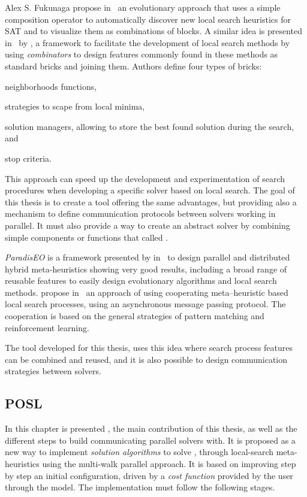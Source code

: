 Alex S. Fukunaga propose in~\cite{Fukunaga2008} an evolutionary approach that uses a simple composition operator to automatically discover new local search heuristics for SAT and to visualize them as combinations of blocks. A similar idea is presented in~\cite{Landtsheer2015} by , a framework to facilitate the development of local search methods by using \textit{combinators} to design features commonly found in these methods as standard bricks and joining them. Authors define four types of bricks: \begin{inparaenum}[1-] \item neighborhoods functions, \item strategies to scape from local minima, \item solution managers, allowing to store the best found solution during the search, and \item stop criteria.
\end{inparaenum} This approach can speed up the development and experimentation of search procedures when developing a specific solver based on local search. The goal of this thesis is to create a tool offering the same advantages, but providing also a mechanism to define communication protocols between solvers working in parallel. It must also provide a way to create an abstract solver by combining simple components or functions that called \ms.

{\it ParadisEO} is a framework presented by  in~\cite{Cahon2004} to design parallel and distributed hybrid meta-heuristics showing very good results, including a broad range of reusable features to easily design evolutionary algorithms and local search methods.  propose in~\cite{Martin2016} an approach of using cooperating meta--heuristic based local search processes, using an asynchronous message passing protocol. The cooperation is based on the general strategies of pattern matching and reinforcement learning. 

The tool developed for this thesis, uses this idea where search process features can be combined and reused, and it is also possible to design communication strategies between solvers.

\subsection{POSL}

In this chapter is presented \posl{}, the main contribution of this thesis, as well as the different steps to build communicating parallel solvers with. It is proposed as a new way to implement \textit{solution algorithms} to solve \CSPs, through local-search meta-heuristics using the multi-walk parallel approach. It is based on improving step by step an initial configuration, driven by a \textit{cost function} provided by the user through the model. The implementation must follow the following stages.

